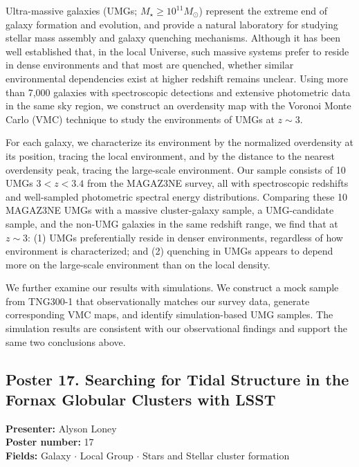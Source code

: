 Ultra-massive galaxies (UMGs; $M_\star \geq 10^{11} M_\odot$) represent the extreme end of galaxy formation and evolution, and provide a natural laboratory for studying stellar mass assembly and galaxy quenching mechanisms. Although it has been well established that, in the local Universe, such massive systems prefer to reside in dense environments and that most are quenched, whether similar environmental dependencies exist at higher redshift remains unclear. Using more than 7,000 galaxies with spectroscopic detections and extensive photometric data in the same sky region, we construct an overdensity map with the Voronoi Monte Carlo (VMC) technique to study the environments of UMGs at $z\sim 3$.

For each galaxy, we characterize its environment by the normalized overdensity at its position, tracing the local environment, and by the distance to the nearest overdensity peak, tracing the large-scale environment. Our sample consists of 10 UMGs $3<z<3.4$ from the MAGAZ3NE survey, all with spectroscopic redshifts and well-sampled photometric spectral energy distributions. Comparing these 10 MAGAZ3NE UMGs with a massive cluster-galaxy sample, a UMG-candidate sample, and the non-UMG galaxies in the same redshift range, we find that at $z\sim 3$: (1) UMGs preferentially reside in denser environments, regardless of how environment is characterized; and (2) quenching in UMGs appears to depend more on the large-scale environment than on the local density.

We further examine our results with simulations. We construct a mock sample from TNG300-1 that observationally matches our survey data, generate corresponding VMC maps, and identify simulation-based UMG samples. The simulation results are consistent with our observational findings and support the same two conclusions above.

\hypertarget{poster-abstract-talk-179}{}\label{poster-abstract-page-talk-179}
\subsection*{Poster 17. Searching for Tidal Structure in the Fornax Globular Clusters with LSST}
\textbf{Presenter:} Alyson Loney\\
\textbf{Poster number:} 17\\
\textbf{Fields:} Galaxy $\cdot$ Local Group $\cdot$ Stars and Stellar cluster formation

